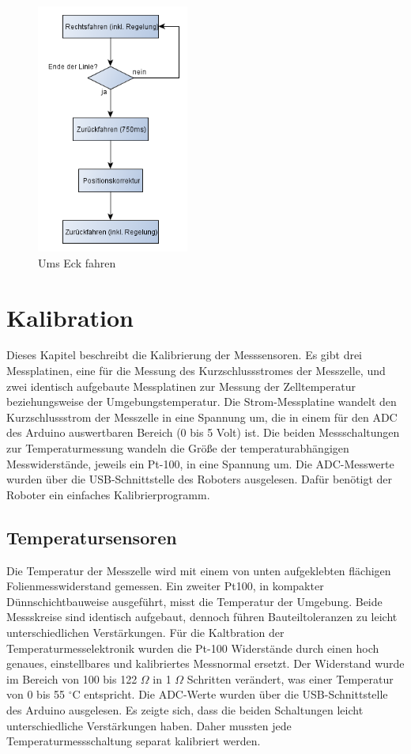 \documentclass[a4paper,bibtotoc,oneside]{scrbook}
\begin{document}
\begin{figure}[htbp]
\centering
\includegraphics[width=50mm]{img/ecke2.png}
\caption{Ums Eck fahren}\label{eck}
\end{figure}


\chapter{Kalibration}\thispagestyle{empty}

Dieses Kapitel beschreibt die Kalibrierung der Messsensoren. Es gibt drei Messplatinen, eine für die Messung des Kurzschlussstromes der Messzelle, und zwei identisch aufgebaute Messplatinen zur Messung der Zelltemperatur beziehungsweise der Umgebungstemperatur. Die Strom-Messplatine wandelt den Kurzschlussstrom der Messzelle in eine Spannung um, die in einem für den ADC des Arduino auswertbaren Bereich (0 bis 5 Volt) ist. Die beiden Messschaltungen zur Temperaturmessung wandeln die Größe der temperaturabhängigen Messwiderstände, jeweils ein Pt-100, in eine Spannung um.
Die ADC-Messwerte wurden über die USB-Schnittstelle des Roboters ausgelesen. Dafür benötigt der Roboter ein einfaches Kalibrierprogramm.



\section{Temperatursensoren}\thispagestyle{empty}
Die Temperatur der Messzelle wird mit einem von unten aufgeklebten flächigen Folienmesswiderstand gemessen. 
Ein zweiter Pt100, in kompakter Dünnschichtbauweise ausgeführt, misst die Temperatur der Umgebung. Beide Messskreise sind identisch aufgebaut, dennoch führen Bauteiltoleranzen zu leicht unterschiedlichen Verstärkungen.
Für die Kaltbration der Temperaturmesselektronik wurden die Pt-100 Widerstände durch einen hoch genaues, einstellbares und kalibriertes Messnormal ersetzt. Der Widerstand wurde im Bereich von 100 bis 122 	$\Omega$  in 1 $\Omega$  Schritten verändert, was einer Temperatur von 0 bis 55 $^{\circ}$C entspricht. Die ADC-Werte wurden über die USB-Schnittstelle des Arduino ausgelesen. Es zeigte sich, dass die beiden Schaltungen leicht unterschiedliche Verstärkungen haben. Daher mussten jede Temperaturmessschaltung separat kalibriert werden.
\end{document}
